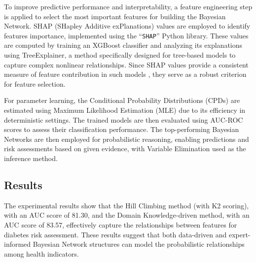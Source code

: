 \documentclass[letterpaper]{article}
\begin{document}
To improve predictive performance and interpretability, a feature engineering step is applied to select the most important features for building the Bayesian Network. SHAP (SHapley Additive exPlanations) values are employed to identify features importance, implemented using the ``\texttt{SHAP}'' Python library. These values are computed by training an XGBoost classifier \citep{XGBoost} and analyzing its explanations using TreeExplainer, a method specifically designed for tree-based models to capture complex nonlinear relationships. Since SHAP values provide a consistent measure of feature contribution in such models \citep{SHAP}, they serve as a robust criterion for feature selection.




For parameter learning, the Conditional Probability Distributions (CPDs) are estimated using Maximum Likelihood Estimation (MLE) due to its efficiency in deterministic settings. The trained models are then evaluated using AUC-ROC scores to assess their classification performance.
The top-performing Bayesian Networks are then employed for probabilistic reasoning, enabling predictions and risk assessments based on given evidence, with Variable Elimination used as the inference method.   


\subsection{Results}

The experimental results show that the Hill Climbing method (with K2 scoring), with an AUC score of 81.30, and the Domain Knowledge-driven method, with an AUC score of 83.57, effectively capture the relationships between features for diabetes risk assessment. These results suggest that both data-driven and expert-informed Bayesian Network structures can model the probabilistic relationships among health indicators.
\end{document}

